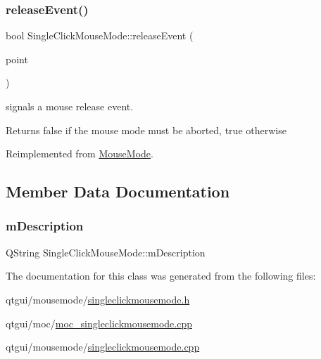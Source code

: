 \mbox{\label{class_single_click_mouse_mode_a182c0fae56fb11784de5f7f1a5a21234}} 
\subsubsection{\texorpdfstring{releaseEvent()}{releaseEvent()}}
{\footnotesize\ttfamily bool Single\+Click\+Mouse\+Mode\+::release\+Event (\begin{DoxyParamCaption}\item[{const Q\+PointF \&}]{point }\end{DoxyParamCaption})\hspace{0.3cm}{\ttfamily [virtual]}}



signals a mouse release event. 

\begin{DoxyReturn}{Returns}
false if the mouse mode must be aborted, true otherwise 
\end{DoxyReturn}


Reimplemented from \mbox{\hyperlink{class_mouse_mode_a9515661d7c29ab234b7e70d0fe7e5db0}{Mouse\+Mode}}.



\subsection{Member Data Documentation}
\mbox{\label{class_single_click_mouse_mode_af1f7ce39684956992017e32362742254}} 
\subsubsection{\texorpdfstring{mDescription}{mDescription}}
{\footnotesize\ttfamily Q\+String Single\+Click\+Mouse\+Mode\+::m\+Description\hspace{0.3cm}{\ttfamily [protected]}}



The documentation for this class was generated from the following files\+:\begin{DoxyCompactItemize}
\item 
qtgui/mousemode/\mbox{\hyperlink{singleclickmousemode_8h}{singleclickmousemode.\+h}}\item 
qtgui/moc/\mbox{\hyperlink{moc__singleclickmousemode_8cpp}{moc\+\_\+singleclickmousemode.\+cpp}}\item 
qtgui/mousemode/\mbox{\hyperlink{singleclickmousemode_8cpp}{singleclickmousemode.\+cpp}}\end{DoxyCompactItemize}
